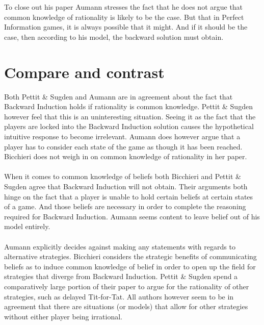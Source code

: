 \documentclass{article}
\begin{document}
\\
\\
To close out his paper Aumann stresses the fact that he does not argue that common knowledge of rationality is likely to be the case. But that in Perfect Information games, it is always possible that it might. And if it should be the case, then according to his model, the backward solution must obtain. 



















\section{Compare and contrast}

Both Pettit \& Sugden and Aumann are in agreement about the fact that Backward Induction holds if rationality is common knowledge. Pettit \& Sugden however feel that this is an uninteresting situation. Seeing it as the fact that the players are locked into the Backward Induction solution causes the hypothetical intuitive response to become irrelevant. Aumann does however argue that a player has to consider each state of the game as though it has been reached. Bicchieri does not weigh in on common knowledge of rationality in her paper.
\\
\\
When it comes to common knowledge of beliefs both Bicchieri and Pettit \& Sugden agree that Backward Induction will not obtain. Their arguments both hinge on the fact that a player is unable to hold certain beliefs at certain states of a game. And those beliefs are necessary in order to complete the reasoning required for Backward Induction. Aumann seems content to leave belief out of his model entirely.
\\
\\
Aumann explicitly decides against making any statements with regards to alternative strategies. Bicchieri considers the strategic benefits of communicating beliefs as to induce common knowledge of belief in order to open up the field for strategies that diverge from Backward Induction. Pettit \& Sugden spend a comparatively large portion of their paper to argue for the rationality of other strategies, such as delayed Tit-for-Tat. All authors however seem to be in agreement that there are situations (or models) that allow for other strategies without either player being irrational.
\end{document}
